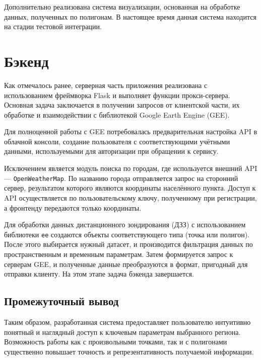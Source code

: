 Дополнительно реализована система визуализации, основанная на обработке данных, полученных по полигонам. В настоящее время данная система находится на стадии тестовой интеграции.

\section{Бэкенд}

Как отмечалось ранее, серверная часть приложения реализована с использованием фреймворка Flask и выполняет функции прокси-сервера. Основная задача заключается в получении запросов от клиентской части, их обработке и взаимодействии с библиотекой Google Earth Engine (GEE).

Для полноценной работы с GEE потребовалась предварительная настройка API в облачной консоли, создание пользователя с соответствующими учётными данными, используемыми для авторизации при обращении к сервису.

Исключением является модуль поиска по городам, где используется внешний API — \texttt{OpenWeatherMap}. По названию города отправляется запрос на сторонний сервер, результатом которого являются координаты населённого пункта. Доступ к API осуществляется по пользовательскому ключу, полученному при регистрации, а фронтенду передаются только координаты.

Для обработки данных дистанционного зондирования (ДЗЗ) с использованием библиотеки \texttt{ee} создаются объекты соответствующего типа (точка или полигон). После этого выбирается нужный датасет, и производится фильтрация данных по пространственным и временным параметрам. Затем формируется запрос к серверам GEE, и полученные данные преобразуются в формат, пригодный для отправки клиенту. На этом этапе задача бэкенда завершается.

\subsection*{Промежуточный вывод}

Таким образом, разработанная система предоставляет пользователю интуитивно понятный и наглядный доступ к ключевым параметрам выбранного региона. Возможность работы как с произвольными точками, так и с полигонами существенно повышает точность и репрезентативность получаемой информации.
